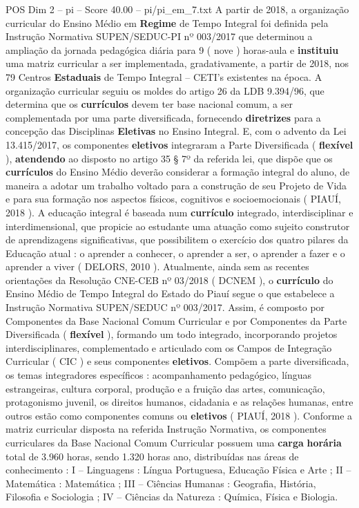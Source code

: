 \begin{textsample}{POS Dim 2 – pi – Score 40.00 – pi/pi\_em\_7.txt}
A partir de 2018, a organização curricular do Ensino Médio em \textbf{Regime} de Tempo Integral foi definida pela Instrução Normativa SUPEN/SEDUC-PI nº 003/2017 que determinou a ampliação da jornada pedagógica diária para 9 ( nove ) horas-aula e \textbf{instituiu} uma matriz curricular a ser implementada, gradativamente, a partir de 2018, nos 79 Centros \textbf{Estaduais} de Tempo Integral – CETI’s existentes na época.
A organização curricular seguiu os moldes do artigo 26 da LDB 9.394/96, que determina que os \textbf{currículos} devem ter base nacional comum, a ser complementada por uma parte diversificada, fornecendo \textbf{diretrizes} para a concepção das Disciplinas \textbf{Eletivas} no Ensino Integral.
E, com o advento da Lei 13.415/2017, os componentes \textbf{eletivos} integraram a Parte Diversificada ( \textbf{flexível} ), \textbf{atendendo} ao disposto no artigo 35 § 7º da referida lei, que dispõe que os \textbf{currículos} do Ensino Médio deverão considerar a formação integral do aluno, de maneira a adotar um trabalho voltado para a construção de seu Projeto de Vida e para sua formação nos aspectos físicos, cognitivos e socioemocionais ( PIAUÍ, 2018 ).
A educação integral é baseada num \textbf{currículo} integrado, interdisciplinar e interdimensional, que propicie ao estudante uma atuação como sujeito construtor de aprendizagens significativas, que possibilitem o exercício dos quatro pilares da Educação atual : o aprender a conhecer, o aprender a ser, o aprender a fazer e o aprender a viver ( DELORS, 2010 ).
Atualmente, ainda sem as recentes orientações da Resolução CNE-CEB nº 03/2018 ( DCNEM ), o \textbf{currículo} do Ensino Médio de Tempo Integral do Estado do Piauí segue o que estabelece a Instrução Normativa SUPEN/SEDUC nº 003/2017.
Assim, é composto por Componentes da Base Nacional Comum Curricular e por Componentes da Parte Diversificada ( \textbf{flexível} ), formando um todo integrado, incorporando projetos interdisciplinares, complementado e articulado com os Campos de Integração Curricular ( CIC ) e seus componentes \textbf{eletivos}.
Compõem a parte diversificada, os temas integradores específicos : acompanhamento pedagógico, línguas estrangeiras, cultura corporal, produção e a fruição das artes, comunicação, protagonismo juvenil, os direitos humanos, cidadania e as relações humanas, entre outros estão como componentes comuns ou \textbf{eletivos} ( PIAUÍ, 2018 ).
Conforme a matriz curricular disposta na referida Instrução Normativa, os componentes curriculares da Base Nacional Comum Curricular possuem uma \textbf{carga} \textbf{horária} total de 3.960 horas, sendo 1.320 horas ano, distribuídas nas áreas de conhecimento : I – Linguagens : Língua Portuguesa, Educação Física e Arte ; II – Matemática : Matemática ; III – Ciências Humanas : Geografia, História, Filosofia e Sociologia ; IV – Ciências da Natureza : Química, Física e Biologia.

\end{textsample}
